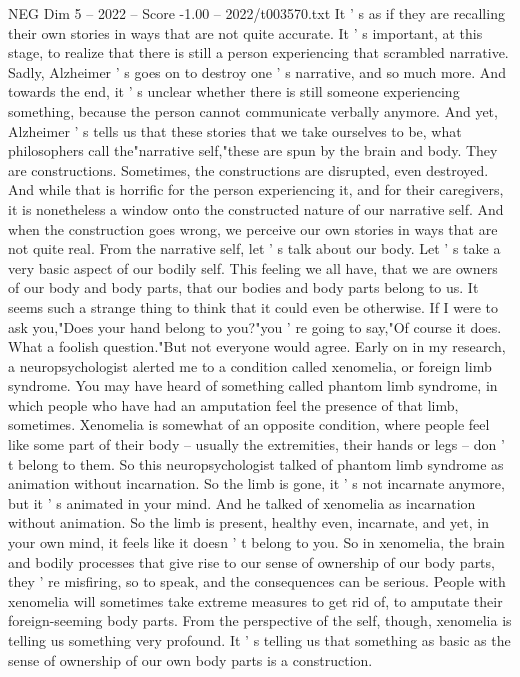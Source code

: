 \begin{textsample}{NEG Dim 5 – 2022 – Score -1.00 – 2022/t003570.txt}
It ' s as if they are recalling their own stories in ways that are not quite accurate.
It ' s important, at this stage, to realize that there is still a person experiencing that scrambled narrative.
Sadly, Alzheimer ' s goes on to destroy one ' s narrative, and so much more.
And towards the end, it ' s unclear whether there is still someone experiencing something, because the person cannot communicate verbally anymore.
And yet, Alzheimer ' s tells us that these stories that we take ourselves to be, what philosophers call the"narrative self,"these are spun by the brain and body.
They are constructions.
Sometimes, the constructions are disrupted, even destroyed.
And while that is horrific for the person experiencing it, and for their caregivers, it is nonetheless a window onto the constructed nature of our narrative self.
And when the construction goes wrong, we perceive our own stories in ways that are not quite real.
From the narrative self, let ' s talk about our body.
Let ' s take a very basic aspect of our bodily self.
This feeling we all have, that we are owners of our body and body parts, that our bodies and body parts belong to us.
It seems such a strange thing to think that it could even be otherwise.
If I were to ask you,"Does your hand belong to you?"you ' re going to say,"Of course it does.
What a foolish question."But not everyone would agree.
Early on in my research, a neuropsychologist alerted me to a condition called xenomelia, or foreign limb syndrome.
You may have heard of something called phantom limb syndrome, in which people who have had an amputation feel the presence of that limb, sometimes.
Xenomelia is somewhat of an opposite condition, where people feel like some part of their body -- usually the extremities, their hands or legs -- don ' t belong to them.
So this neuropsychologist talked of phantom limb syndrome as animation without incarnation.
So the limb is gone, it ' s not incarnate anymore, but it ' s animated in your mind.
And he talked of xenomelia as incarnation without animation.
So the limb is present, healthy even, incarnate, and yet, in your own mind, it feels like it doesn ' t belong to you.
So in xenomelia, the brain and bodily processes that give rise to our sense of ownership of our body parts, they ' re misfiring, so to speak, and the consequences can be serious.
People with xenomelia will sometimes take extreme measures to get rid of, to amputate their foreign-seeming body parts.
From the perspective of the self, though, xenomelia is telling us something very profound.
It ' s telling us that something as basic as the sense of ownership of our own body parts is a construction.

\end{textsample}
